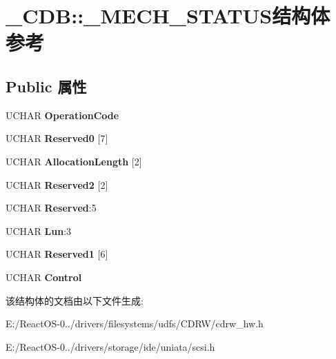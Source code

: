 \hypertarget{struct___c_d_b_1_1___m_e_c_h___s_t_a_t_u_s}{}\section{\+\_\+\+C\+DB\+:\+:\+\_\+\+M\+E\+C\+H\+\_\+\+S\+T\+A\+T\+U\+S结构体 参考}
\label{struct___c_d_b_1_1___m_e_c_h___s_t_a_t_u_s}
\subsection*{Public 属性}
\begin{DoxyCompactItemize}
\item 
\mbox{\label{struct___c_d_b_1_1___m_e_c_h___s_t_a_t_u_s_a86d3f4c2acbead57d790332ac392137e}} 
U\+C\+H\+AR {\bfseries Operation\+Code}
\item 
\mbox{\label{struct___c_d_b_1_1___m_e_c_h___s_t_a_t_u_s_a46568cb1e6b4027e80abf623eae622af}} 
U\+C\+H\+AR {\bfseries Reserved0} \mbox{[}7\mbox{]}
\item 
\mbox{\label{struct___c_d_b_1_1___m_e_c_h___s_t_a_t_u_s_a4e673c065c3788346daa5a84527c8d02}} 
U\+C\+H\+AR {\bfseries Allocation\+Length} \mbox{[}2\mbox{]}
\item 
\mbox{\label{struct___c_d_b_1_1___m_e_c_h___s_t_a_t_u_s_aa7633119857d9a8d9fe0aa6432c8643b}} 
U\+C\+H\+AR {\bfseries Reserved2} \mbox{[}2\mbox{]}
\item 
\mbox{\label{struct___c_d_b_1_1___m_e_c_h___s_t_a_t_u_s_a455730023133e46b9b64ee0b5babd892}} 
U\+C\+H\+AR {\bfseries Reserved}\+:5
\item 
\mbox{\label{struct___c_d_b_1_1___m_e_c_h___s_t_a_t_u_s_a2b13592bcecc66af922cd5aea4aae900}} 
U\+C\+H\+AR {\bfseries Lun}\+:3
\item 
\mbox{\label{struct___c_d_b_1_1___m_e_c_h___s_t_a_t_u_s_ab1584e619fc88d7f8a05607a8a7f1828}} 
U\+C\+H\+AR {\bfseries Reserved1} \mbox{[}6\mbox{]}
\item 
\mbox{\label{struct___c_d_b_1_1___m_e_c_h___s_t_a_t_u_s_ab6fdd4b61faffa2cbda7bca8a67569e6}} 
U\+C\+H\+AR {\bfseries Control}
\end{DoxyCompactItemize}


该结构体的文档由以下文件生成\+:\begin{DoxyCompactItemize}
\item 
E\+:/\+React\+O\+S-\/0../drivers/filesystems/udfs/\+C\+D\+R\+W/cdrw\+\_\+hw.\+h\item 
E\+:/\+React\+O\+S-\/0../drivers/storage/ide/uniata/scsi.\+h\end{DoxyCompactItemize}
